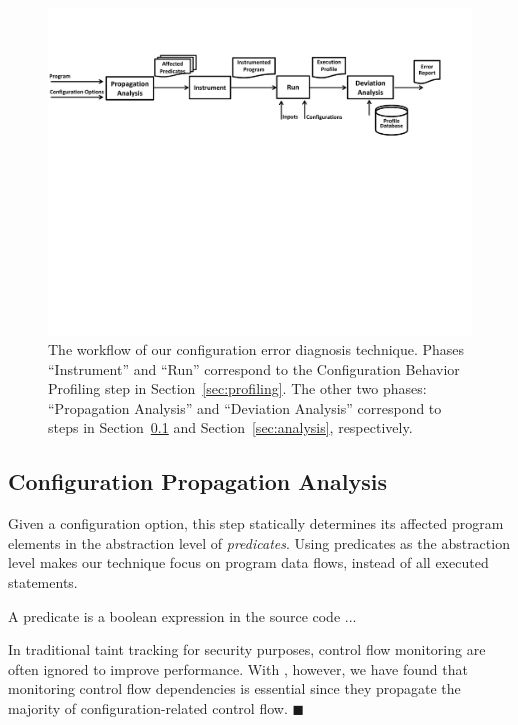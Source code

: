 \begin{figure}[!]
  \centering
  \includegraphics[scale=0.600]{architecture}
  \vspace*{-2.0ex}\caption {{\label{fig:workflow} The workflow of our configuration error diagnosis technique.
Phases ``Instrument'' and ``Run'' correspond to the Configuration Behavior Profiling step in Section~\ref{sec:profiling}.
The other two phases: ``Propagation Analysis'' and ``Deviation Analysis'' correspond to steps in Section~\ref{sec:prop} and Section~\ref{sec:analysis}, respectively.
}}
\end{figure}

\subsection{Configuration Propagation Analysis}
\label{sec:prop}

Given a configuration option, this step statically determines its affected program
elements in the abstraction level of \textit{predicates}. Using predicates
as the abstraction level makes our technique focus on program data flows, instead
of all executed statements.

A predicate is a boolean expression in the source code ...

In traditional taint tracking for security purposes, control
flow monitoring are often ignored to improve performance.
With \ourtool, however, we have found that monitoring control flow
dependencies is essential since they propagate the majority of
configuration-related control flow. $\blacksquare$


